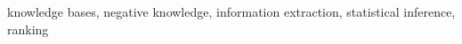 \documentclass[5p]{elsarticle}
\begin{document}
\begin{abstract}
\begin{comment}
Knowledge bases (KBs), pragmatic collections of knowledge about notable entities, are an important asset in applications such as search, question answering and dialogue. Rooted in a long tradition in knowledge representation, all popular KBs only store positive information, but abstain from taking any stance towards statements not contained in them.
% 
  In this paper, we make the case for explicitly stating useful statements which are \textit{not} true. Negative statements would be important to overcome current limitations of question answering, yet due to their potential abundance, any effort towards compiling them needs a tight coupling with ranking. We introduce an approach towards automatically compiling negative statements, based on expectations set from positive statements of related entities, which we then rank using supervised and unsupervised features. Experimental results show that this approach hold promising potential to discover notable negations. Along with this paper, we make the first resources on useful negative statements available, along with a web-based browsing interface for Wikidata entities, and code that allows researchers to discover useful negations in their own data.
\end{comment} 

\end{abstract}



\begin{keyword}
knowledge bases, negative knowledge, 
information extraction, 
statistical inference,
ranking
\end{keyword}

\maketitle    














\end{document}
